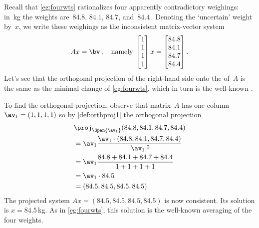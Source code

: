 \begin{example} \label{eg:fourwts2}
Recall that \cref{eg:fourwts} rationalizes four apparently contradictory weighings: in~kg the weights are~\(84.8\), \(84.1\), \(84.7\), and~\(84.4\)\,.
Denoting the `uncertain' weight by~\(x\),  we write these weighings as the inconsistent matrix-vector system
\begin{equation*}
Ax=\bv\,,\quad\text{namely }
\begin{bmatrix} 1\\1\\1\\1 \end{bmatrix}x
=\begin{bmatrix} 84.8\\84.1\\84.7\\84.4 \end{bmatrix}.
\end{equation*}
Let's see that the orthogonal projection of the right-hand side onto the  of~\(A\) is the same as the minimal change of \cref{eg:fourwts}, which in turn is the well-known .

To find the orthogonal projection, observe that matrix~\(A\) has one column \(\av_1=(1,1,1,1)\) so by \cref{def:orthproj1} the orthogonal projection
\begin{align*}&
\proj_{\Span\{\av_1\}}(84.8,84.1,84.7,84.4)
\\&=\av_1\frac{\av_1\cdot(84.8,84.1,84.7,84.4)}{|\av_1|^2}
\\&=\av_1\frac{84.8+84.1+84.7+84.4}{1+1+1+1}
\\&=\av_1\cdot 84.5
\\&=(84.5,84.5,84.5,84.5).
\end{align*}
The projected system \(Ax=(84.5,84.5,84.5,84.5)\) is now consistent. Its solution is \(x=84.5\)\,kg.
As in \cref{eg:fourwts}, this solution is the well-known averaging of the four weights.
\end{example}


